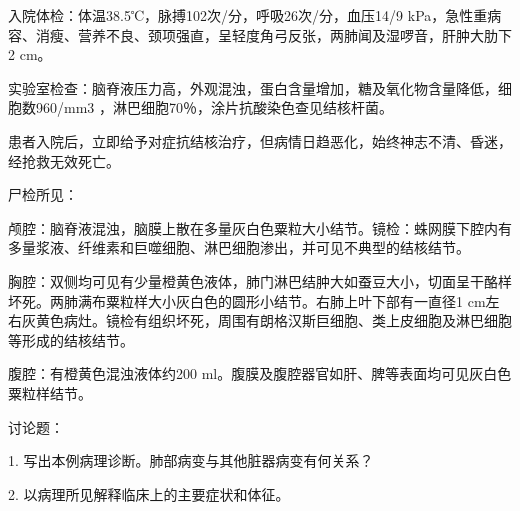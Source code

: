 入院体检：体温38.5℃，脉搏102次/分，呼吸26次/分，血压14/9
kPa，急性重病容、消瘦、营养不良、颈项强直，呈轻度角弓反张，两肺闻及湿啰音，肝肿大肋下2
cm。

实验室检查：脑脊液压力高，外观混浊，蛋白含量增加，糖及氧化物含量降低，细胞数960/mm{3}
，淋巴细胞70％，涂片抗酸染色查见结核杆菌。

患者入院后，立即给予对症抗结核治疗，但病情日趋恶化，始终神志不清、昏迷，经抢救无效死亡。

尸检所见：

颅腔：脑脊液混浊，脑膜上散在多量灰白色粟粒大小结节。镜检：蛛网膜下腔内有多量浆液、纤维素和巨噬细胞、淋巴细胞渗出，并可见不典型的结核结节。

胸腔：双侧均可见有少量橙黄色液体，肺门淋巴结肿大如蚕豆大小，切面呈干酪样坏死。两肺满布粟粒样大小灰白色的圆形小结节。右肺上叶下部有一直径1
cm左右灰黄色病灶。镜检有组织坏死，周围有朗格汉斯巨细胞、类上皮细胞及淋巴细胞等形成的结核结节。

腹腔：有橙黄色混浊液体约200
ml。腹膜及腹腔器官如肝、脾等表面均可见灰白色粟粒样结节。

讨论题：

1. 写出本例病理诊断。肺部病变与其他脏器病变有何关系？

2. 以病理所见解释临床上的主要症状和体征。




